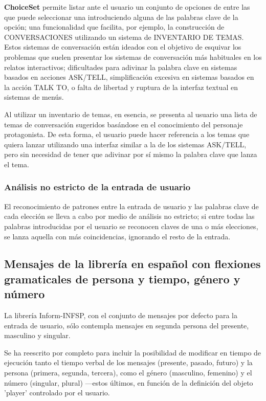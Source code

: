 \textbf{ChoiceSet} permite listar ante el usuario un conjunto de opciones de entre las que puede seleccionar una introduciendo alguna de las palabras clave de la opción; una funcionalidad que facilita, por ejemplo, la construcción de CONVERSACIONES utilizando un sistema de INVENTARIO DE TEMAS. Estos sistemas de conversación están ideados con el objetivo de esquivar los problemas que suelen presentar los sistemas de conversación más habituales en los relatos interactivos; dificultades para adivinar la palabra clave en sistemas basados en acciones ASK/TELL, simplificación excesiva en sistemas basados en la acción TALK TO, o falta de libertad y ruptura de la interfaz textual en sistemas de menús.

Al utilizar un inventario de temas, en esencia, se presenta al usuario una lista de temas de conversación sugeridos basándose en el conocimiento del personaje protagonista. De esta forma, el usuario puede hacer referencia a los temas que quiera lanzar utilizando una interfaz similar a la de los sistemas ASK/TELL, pero sin necesidad de tener que adivinar por sí mismo la palabra clave que lanza el tema.

\subsubsection{Análisis no estricto de la entrada de usuario}

El reconocimiento de patrones entre la entrada de usuario y las palabras clave de cada elección se lleva a cabo por medio de análisis no estricto; si entre todas las palabras introducidas por el usuario se reconocen claves de una o más elecciones, se lanza aquella con más coincidencias, ignorando el resto de la entrada.

\subsection{Mensajes de la librería en español con flexiones gramaticales de persona y tiempo, género y número}

La librería Inform-INFSP, con el conjunto de mensajes por defecto para la entrada de usuario, sólo contempla mensajes en segunda persona del presente, masculino y singular.

Se ha reescrito por completo para incluir la posibilidad de modificar en tiempo de ejecución tanto el tiempo verbal de los mensajes (presente, pasado, futuro) y la persona (primera, segunda, tercera), como el género (masculino, femenino) y el número (singular, plural) ---estos últimos, en función de la definición del objeto 'player' controlado por el usuario.

